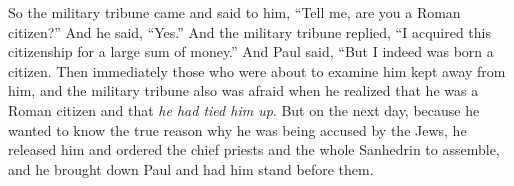 \begin{biblechapter}
\verse So the military tribune came and said to him, “Tell me, are you a Roman citizen?” And he said, “Yes.”
\verse And the military tribune replied, “I acquired this citizenship for a large sum of money.” And Paul said, “But I indeed was born a citizen.
\verse Then immediately those who were about to examine him kept away from him, and the military tribune also was afraid when he realized that he was a Roman citizen and that \textit{he had tied him up}.
\verse But on the next day, because he wanted to know the true reason why he was being accused by the Jews, he released him and ordered the chief priests and the whole Sanhedrin to assemble, and he brought down Paul and had him stand before them.
\end{biblechapter}

